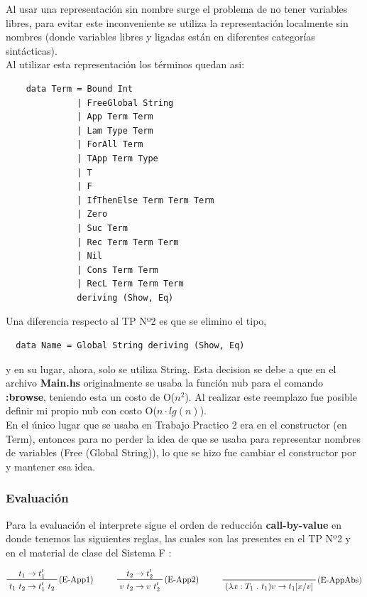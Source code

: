 \documentclass[12pt, titlepage, a4paper]{article}
\begin{document}
Al usar una representación sin nombre surge el problema de no tener variables libres,  
para evitar este inconveniente se utiliza la representación localmente sin nombres (donde variables libres y ligadas están 
en diferentes categorías sintácticas). \\
\noindent Al utilizar esta representación los términos quedan asi:
\begin{verbatim}
    data Term = Bound Int
              | FreeGlobal String 
              | App Term Term
              | Lam Type Term
              | ForAll Term
              | TApp Term Type
              | T
              | F
              | IfThenElse Term Term Term
              | Zero
              | Suc Term
              | Rec Term Term Term
              | Nil
              | Cons Term Term
              | RecL Term Term Term
              deriving (Show, Eq)
\end{verbatim}

\noindent Una diferencia respecto al TP Nº2 \cite{tp2:lambdaCalculoSimpleTipado} es que se elimino el tipo,
\begin{verbatim}
  data Name = Global String deriving (Show, Eq)  
\end{verbatim}
y en su lugar, ahora, solo se utiliza String. Esta decision se debe a que en el archivo \textbf{Main.hs} originalmente se usaba la función 
nub para el comando \textbf{:browse}, teniendo esta un costo de O($n^2$). Al realizar este reemplazo fue posible definir mi propio nub 
con costo O($n\cdot lg(n)$). \\

En el único lugar que se usaba  en Trabajo Practico 2 era en el constructor  (en Term), 
entonces para no perder la idea de que  se usaba para 
representar nombres de variables  (Free (Global String)), lo que se hizo fue cambiar el constructor  por 
 y mantener esa idea. 

\subsubsection{Evaluación}
Para la evaluación el interprete sigue el orden de reducción \textbf{call-by-value} en donde tenemos las siguientes reglas, las cuales 
son las presentes en el TP Nº2 \cite{tp2:lambdaCalculoSimpleTipado} y en el material de clase del Sistema F \cite{ALP:Polimorfismo}:

\begin{displaymath}
    \prftree[r]{(E-App1)}{t_1 \rightarrow t_1'}{t_1 \ t_2 \rightarrow t_1' \ t_2}  \hspace{1cm}
    \prftree[r]{(E-App2)}{t_2 \rightarrow t_2'}{v \ t_2 \rightarrow v \ t_2'}  \hspace{1cm}
    \prftree[r]{(E-AppAbs)}{}{(\lambda x : T_1 \ . \ t_1 ) v \rightarrow t_1[x/v]}
\end{displaymath}
\end{document}
